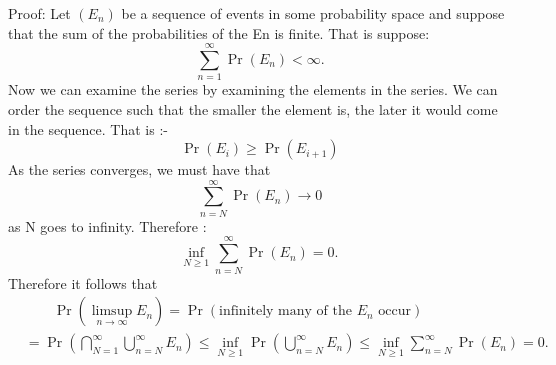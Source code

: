 \documentclass[11pt,letterpaper]{article} \usepackage[latin1]{inputenc}
\begin{document}
\noindent Proof: 
Let $(E_n)$ be a sequence of events in some probability space and suppose that the sum of the probabilities of the En is finite. That is suppose:
\begin{equation}
\sum_{n=1}^\infty \Pr(E_n)<\infty.
\end{equation}
Now we can examine the series by examining the elements in the series. We can order the sequence such that the smaller the element is, the later it would come in the sequence. That is :-
\begin{equation}
\Pr(E_i) \ge \Pr(E_{i + 1})
\end{equation}
As the series converges, we must have that
\begin{equation}
\sum_{n = N} ^\infty \Pr(E_n) \rightarrow 0
\end{equation}
as N goes to infinity. Therefore :
\begin{equation}
 \inf_{N\geq 1} \sum_{n=N}^\infty \Pr(E_n) = 0. \, 
\end{equation}
Therefore it follows that
\begin{align}
& {}\qquad \Pr\left(\limsup_{n\to\infty} E_n\right) = \Pr(\text{infinitely many of the } E_n \text{ occur} ) \\[8pt]
& = \Pr\left(\bigcap_{N=1}^\infty \bigcup_{n=N}^\infty E_n\right)
\leq \inf_{N \geq 1} \Pr\left( \bigcup_{n=N}^\infty E_n\right) \leq \inf_{N\geq 1} \sum_{n=N}^\infty \Pr(E_n) = 0.
\end{align}
\end{document}

